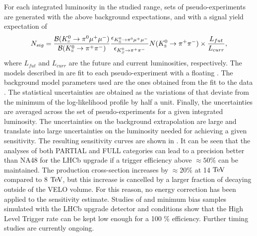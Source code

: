 For each integrated luminosity in the studied range, sets of pseudo-experiments are generated  with the above background expectations,
and with a signal yield expectation of
\begin{equation} 
N_{sig} = \frac{{\cal B}(K^0_{\mathrm{\scriptscriptstyle S}}\to\pi^0\mu^+\mu^-)}{{\cal B}(K^0_{\mathrm{\scriptscriptstyle S}}\to\pi^+\pi^-)} \frac{\epsilon_{K^0_{\mathrm{\scriptscriptstyle S}}\rightarrow\pi^{0}\mu^{+}\mu^{-}}}{\epsilon_{K^{0}_{S}\to\pi^{+}\pi^{-}}}  N(K^0_{\mathrm{\scriptscriptstyle S}}\to\pi^+\pi^-)\times \frac{L_{fut}}{L_{curr}},
\end{equation} %
where $L_{fut}$ and $L_{curr}$ are the future and current luminosities, respectively.
The models described in  are fit to each pseudo-experiment with a floating \BRof\Kspizmm.
The background model parameters used are the ones obtained from the fit to the data . The statistical uncertainties
are obtained as the variations of \BRof\Kspizmm that deviate from the minimum of the log-likelihood profile by half a unit.
Finally, the uncertainties are averaged across the set of pseudo-experiments for a given integrated luminosity.
The uncertainties on the background extrapolation are large and translate into large uncertainties on the luminosity needed for achieving a given sensitivity. The resulting sensitivity curves are shown
in .
It can be seen that the analyses of both PARTIAL and FULL categories can lead to a precision
better than NA48 for the LHCb upgrade if a trigger efficiency above $\approx 50\%$ can be maintained. The \KS production cross-section increases by $\approx20\%$ at 14 $\rm TeV$ compared to 8 $\rm TeV$, but this increase is cancelled by a 
larger fraction of \KS decaying outside of the VELO volume. For this reason, no energy correction has been applied to the sensitivity estimate.
Studies of \Kspizmm and minimum bias samples simulated with the LHCb upgrade detector and conditions show that the High Level
Trigger rate can be kept low enough for a 100 \% efficiency. Further timing studies are currently ongoing.


